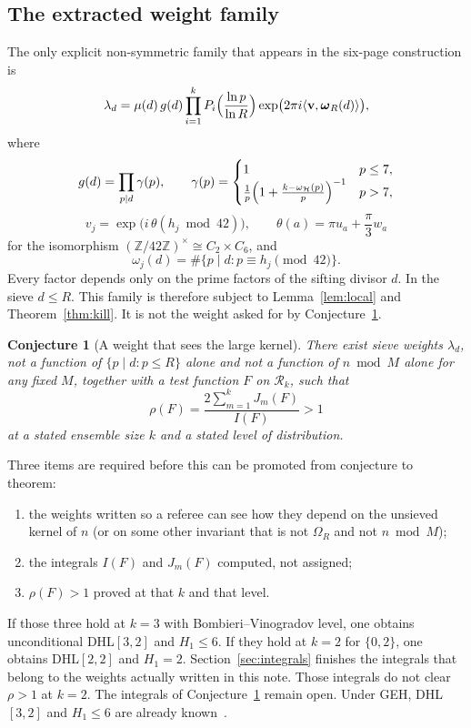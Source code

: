 \documentclass[11pt,a4paper]{article}
\theoremstyle{plain}
\theoremstyle{definition}
\theoremstyle{plain}
\newtheorem{conjecture}{Conjecture}
\numberwithin{equation}{section}
\begin{document}
\subsection{The extracted weight family}
The only explicit non-symmetric family that appears in the six-page construction is
\begin{equation}
\label{eq:lambda}
\lambda_d=\mu(d)\,g(d)\prod_{i=1}^{k}P_i\Bigl(\frac{\ln p}{\ln R}\Bigr)
\exp\bigl(2\pi i\langle\mathbf{v},\boldsymbol{\omega}_R(d)\rangle\bigr),
\end{equation}
where
\[
g(d)=\prod_{p\mid d}\gamma(p),\qquad
\gamma(p)=\begin{cases}
1 & p\le 7,\\
\frac1p\Bigl(1+\frac{k-\omega_{\mathcal{H}}(p)}{p}\Bigr)^{-1} & p>7,
\end{cases}
\]
\[
v_j=\exp\bigl(i\,\theta(h_j\bmod 42)\bigr),\qquad
\theta(a)=\pi u_a+\frac\pi3 w_a
\]
for the isomorphism \((\mathbb{Z}/42\mathbb{Z})^\times\cong C_2\times C_6\), and
\[
\omega_j(d)=\#\{p\mid d:p\equiv h_j\pmod{42}\}.
\]
Every factor depends only on the prime factors of the sifting divisor \(d\). In the sieve \(d\le R\). This family is therefore subject to Lemma~\ref{lem:local} and Theorem~\ref{thm:kill}. It is not the weight asked for by Conjecture~\ref{conj:weight}.

\begin{conjecture}[A weight that sees the large kernel]
\label{conj:weight}
There exist sieve weights \(\lambda_d\), not a function of \(\{p\mid d:p\le R\}\) alone and not a function of \(n\bmod M\) alone for any fixed \(M\), together with a test function \(F\) on \(\mathcal{R}_k\), such that
\[
\rho(F)=\frac{2\sum_{m=1}^{k}J_m(F)}{I(F)}>1
\]
at a stated ensemble size \(k\) and a stated level of distribution.
\end{conjecture}

Three items are required before this can be promoted from conjecture to theorem:
\begin{enumerate}
\item the weights written so a referee can see how they depend on the unsieved kernel of \(n\) (or on some other invariant that is not \(\Omega_R\) and not \(n\bmod M\));
\item the integrals \(I(F)\) and \(J_m(F)\) computed, not assigned;
\item \(\rho(F)>1\) proved at that \(k\) and that level.
\end{enumerate}
If those three hold at \(k=3\) with Bombieri--Vinogradov level, one obtains unconditional DHL\([3,2]\) and \(H_1\le 6\). If they hold at \(k=2\) for \(\{0,2\}\), one obtains DHL\([2,2]\) and \(H_1=2\). Section~\ref{sec:integrals} finishes the integrals that belong to the weights actually written in this note. Those integrals do not clear \(\rho>1\) at \(k=2\). The integrals of Conjecture~\ref{conj:weight} remain open. Under GEH, DHL\([3,2]\) and \(H_1\le 6\) are already known~\cite{Maynard2015,Polymath8b}.
\end{document}
